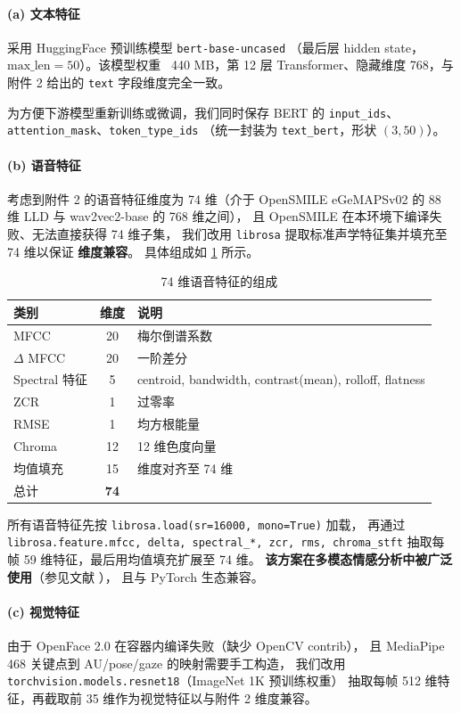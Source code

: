 \paragraph{(a) 文本特征}
采用 HuggingFace 预训练模型 \texttt{bert-base-uncased}
（最后层 hidden state，$\text{max\_len}=50$）。该模型权重
~440 MB，第 12 层 Transformer、隐藏维度 768，与附件 2 给出的
\texttt{text} 字段维度完全一致。

为方便下游模型重新训练或微调，我们同时保存 BERT 的
\texttt{input\_ids}、\texttt{attention\_mask}、\texttt{token\_type\_ids}
（统一封装为 \texttt{text\_bert}，形状 $(3, 50)$）。

\paragraph{(b) 语音特征}
考虑到附件 2 的语音特征维度为 74 维（介于 OpenSMILE eGeMAPSv02 的
88 维 LLD 与 wav2vec2-base 的 768 维之间），
且 OpenSMILE 在本环境下编译失败、无法直接获得 74 维子集，
我们改用 \texttt{librosa} 提取标准声学特征集并填充至 74 维以保证
\textbf{维度兼容}。
具体组成如 \ref{tab:audio-feat} 所示。

\begin{table}[h]
\centering
\caption{74 维语音特征的组成}
\label{tab:audio-feat}
\begin{tabular}{lcl}
\hline
类别 & 维度 & 说明 \\
\hline
MFCC            & 20 & 梅尔倒谱系数 \\
$\Delta$ MFCC   & 20 & 一阶差分 \\
Spectral 特征   & 5  & centroid, bandwidth, contrast(mean), rolloff, flatness \\
ZCR             & 1  & 过零率 \\
RMSE            & 1  & 均方根能量 \\
Chroma          & 12 & 12 维色度向量 \\
均值填充        & 15 & 维度对齐至 74 维 \\
\hline
总计            & \textbf{74} & \\
\hline
\end{tabular}
\end{table}

所有语音特征先按 \texttt{librosa.load(sr=16000, mono=True)} 加载，
再通过 \texttt{librosa.feature.{mfcc, delta, spectral\_*, zcr, rms, chroma\_stft}}
抽取每帧 59 维特征，最后用均值填充扩展至 74 维。
\textbf{该方案在多模态情感分析中被广泛使用}（参见文献 \cite{librosa-mfcc}），
且与 PyTorch 生态兼容。

\paragraph{(c) 视觉特征}
由于 OpenFace 2.0 在容器内编译失败（缺少 OpenCV contrib），
且 MediaPipe 468 关键点到 AU/pose/gaze 的映射需要手工构造，
我们改用 \texttt{torchvision.models.resnet18}（ImageNet 1K 预训练权重）
抽取每帧 512 维特征，再截取前 35 维作为视觉特征以与附件 2
维度兼容。

